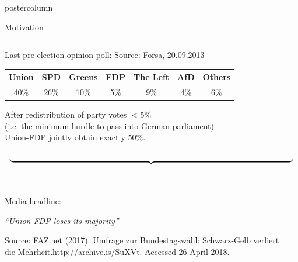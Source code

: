 \documentclass[final,hyperref={pdfpagelabels=false}]{beamer}
\newcommand{\darkgray}[1]{\textcolor{koaladarkgray}{#1}}
\newcommand{\lightgray}[1]{\textcolor{koalagray}{#1}}
\begin{document}
\begin{frame}
\begin{columns}
\begin{column}{1\textwidth}
\begin{beamercolorbox}[center,wd=\textwidth]{postercolumn}
\begin{minipage}[T]{.95\textwidth}
\begin{block}{\footnotesize Motivation}
{{\begin{minipage}{.96\textwidth}
\begin{columns}[t]
  \begin{column}{.29\textwidth}
  \darkgray{Last pre-election opinion poll:} \lightgray{\tiny Source: Forsa, 20.09.2013}
  \\[2.5ex]
  \begin{center}\centering
  \begin{tabular}{ccccccc}
  \toprule
  \darkgray{Union} & {\footnotesize \lightgray{SPD}} & {\footnotesize \lightgray{Greens}} & \darkgray{FDP} & {\footnotesize \lightgray{The Left}} & {\footnotesize \lightgray{AfD}} & {\footnotesize \lightgray{Others}} \\ \midrule
  \darkgray{40\%} & {\footnotesize \lightgray{26\%}} & {\footnotesize \lightgray{10\%}} & \darkgray{5\%} & {\footnotesize \lightgray{9\%}} & {\footnotesize \lightgray{4\%}} & {\footnotesize \lightgray{6\%}} \\
  \bottomrule
  \end{tabular}
  \end{center}
  \vspace{1.5ex}
  \begin{center}\centering
  \darkgray{After redistribution} \lightgray{\footnotesize of party votes $<$5\% \\ (i.e. the minimum hurdle to pass into German parliament)} \\
  \darkgray{Union-FDP} \lightgray{\footnotesize jointly} \darkgray{obtain} \lightgray{\footnotesize exactly} \darkgray{50\%}.
  \end{center}
  \vspace{-3ex}
  \textcolor{koalablue}{$$ \underbrace{\resizebox{\hsize}{!}{ }}_{ } $$}
  \ \\ \vspace{-2ex}
  \begin{mdleftred}
  \begin{minipage}{\textwidth}
  \lightgray{\footnotesize Media headline:}
  \\
  \begin{center}\centering
  \vspace{-2ex}
  \darkgray{\textit{``Union-FDP loses its majority''}}
  \vspace{-.2ex}
  \end{center}
  \lightgray{\tiny Source: FAZ.net (2017). Umfrage zur Bundestagswahl: Schwarz-Gelb verliert \\[-2ex]
  die Mehrheit.http://archive.is/SuXVt. Accessed 26 April 2018.}
  \end{minipage}
  \end{mdleftred}
  \end{column}


\end{columns}
\end{minipage}}}
\end{block}
\end{minipage}
\end{beamercolorbox}
\end{column}
\end{columns}
\end{frame}
\end{document}
